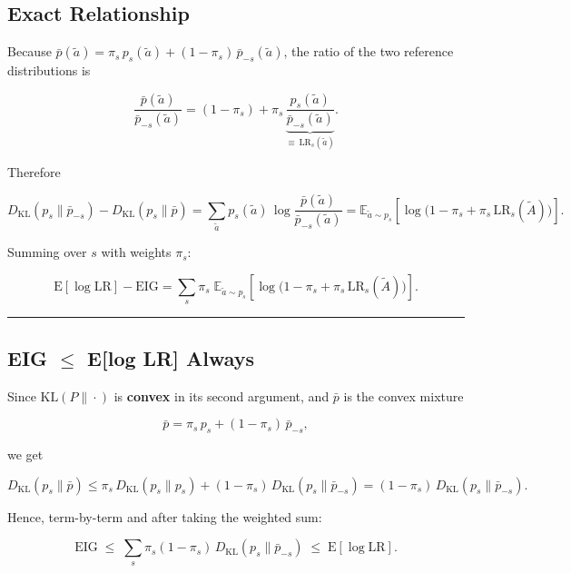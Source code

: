 \documentclass[
]{article}
\begin{document}
\subsection{Exact Relationship}\label{exact-relationship}

Because
\(\bar{p}(\tilde{a}) = \pi_s\, p_s(\tilde{a}) + (1-\pi_s)\,\bar{p}_{-s}(\tilde{a})\),
the ratio of the two reference distributions is

\[\frac{\bar{p}(\tilde{a})}{\bar{p}_{-s}(\tilde{a})} = (1-\pi_s) + \pi_s\,\underbrace{\frac{p_s(\tilde{a})}{\bar{p}_{-s}(\tilde{a})}}_{\displaystyle\equiv\, \mathrm{LR}_s(\tilde{a})}.\]

Therefore

\[D_{\mathrm{KL}}(p_s \| \bar{p}_{-s}) - D_{\mathrm{KL}}(p_s \| \bar{p}) = \sum_{\tilde{a}} p_s(\tilde{a})\,\log\frac{\bar{p}(\tilde{a})}{\bar{p}_{-s}(\tilde{a})} = \mathbb{E}_{\tilde{a}\sim p_s}\!\left[\log\bigl(1-\pi_s + \pi_s\,\mathrm{LR}_s(\tilde{A})\bigr)\right].\]

Summing over \(s\) with weights \(\pi_s\):

\[\boxed{\mathrm{E}[\log \mathrm{LR}] - \mathrm{EIG} = \sum_s \pi_s\;\mathbb{E}_{\tilde{a}\sim p_s}\!\left[\log\bigl(1 - \pi_s + \pi_s\,\mathrm{LR}_s(\tilde{A})\bigr)\right].}\]

\begin{center}\rule{0.5\linewidth}{0.5pt}\end{center}

\subsection{\texorpdfstring{EIG \(\leq\) E{[}log LR{]}
Always}{EIG \textbackslash leq E{[}log LR{]} Always}}\label{eig-leq-elog-lr-always}

Since \(\mathrm{KL}(P\|\cdot)\) is \textbf{convex} in its second
argument, and \(\bar{p}\) is the convex mixture

\[\bar{p} = \pi_s\, p_s + (1-\pi_s)\,\bar{p}_{-s},\]

we get

\[D_{\mathrm{KL}}(p_s \| \bar{p}) \leq \pi_s\, D_{\mathrm{KL}}(p_s \| p_s) + (1-\pi_s)\, D_{\mathrm{KL}}(p_s \| \bar{p}_{-s}) = (1-\pi_s)\, D_{\mathrm{KL}}(p_s \| \bar{p}_{-s}).\]

Hence, term-by-term and after taking the weighted sum:

\[\mathrm{EIG} \;\leq\; \sum_s \pi_s(1-\pi_s)\, D_{\mathrm{KL}}(p_s \| \bar{p}_{-s}) \;\leq\; \mathrm{E}[\log \mathrm{LR}].\]
\end{document}

